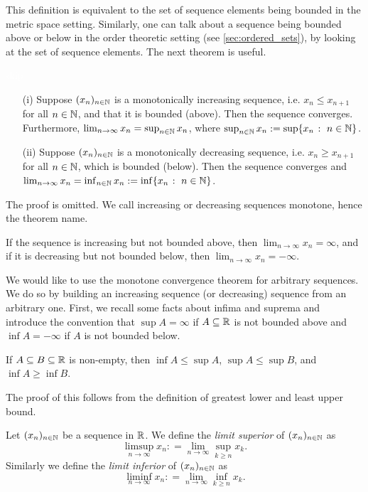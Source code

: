 \documentclass{article}
\begin{document}
This definition is equivalent to the set of sequence elements being bounded in the metric space setting. Similarly, one can talk about a sequence being bounded above or below in the order theoretic setting (see \cref{sec:ordered_sets}), by looking at the set of sequence elements. The next theorem is useful.

\begin{theorem}
\label{thm:mon_conv}
\textcolor{white}{skip}
\begin{itemize}
\item[(i)] Suppose $(x_n)_{n\in {\mathbb{N}}}$ is a monotonically increasing sequence, i.e. $x_n\leq x_{n+1}$ for all $n\in {\mathbb{N}}$, and that it is bounded (above). Then the sequence converges. Furthermore, $\lim_{n\to \infty} x_n = \sup_{n\in {\mathbb{N}}} x_n$, where $\sup_{n\in {\mathbb{N}}} x_n := \sup\{x_n \; \colon \; n\in {\mathbb{N}}\}$.
\item[(ii)] Suppose $(x_n)_{n\in {\mathbb{N}}}$ is a monotonically decreasing sequence, i.e. $x_n\geq x_{n+1}$ for all $n\in {\mathbb{N}}$, which is bounded (below). Then the sequence converges and $\lim_{n\to \infty} x_n = \inf_{n\in {\mathbb{N}}} x_n := \inf\{x_n \; \colon \; n\in {\mathbb{N}}\}$. 
\end{itemize}
\end{theorem}

The proof is omitted. We call increasing or decreasing sequences monotone, hence the theorem name.

If the sequence is increasing but not bounded above, then $\lim_{n\to \infty} x_n = \infty$, and if it is decreasing but not bounded below, then $\lim_{n\to \infty} x_n = -\infty$.

 We would like to use the monotone convergence theorem for arbitrary sequences. We do so by building an increasing sequence (or decreasing) sequence from an arbitrary one. First, we recall some facts about infima and suprema and introduce the convention that $\sup A = \infty$ if $A\subseteq {\mathbb{R}}$ is not bounded above and $\inf A= -\infty$ if $A$ is not bounded below.

\begin{lemma}\label{lem:inf_sup_inequality}
If $A \subseteq B \subseteq {\mathbb{R}}$ is non-empty, then $\inf A \leq \sup A$, $\sup A \leq \sup B$, and $\inf A \geq \inf B$.
\end{lemma}
The proof of this follows from the definition of greatest lower and least upper bound. 

\begin{definition}
Let $(x_n)_{n\in {\mathbb{N}}}$ be a sequence in ${\mathbb{R}}$. We define the \emph{limit superior} of $(x_n)_{n\in {\mathbb{N}}}$ as 
$$\limsup_{n\to \infty} x_n: = \lim_{n\to \infty} \sup_{k\geq n} x_k.$$ 
Similarly we define  the \emph{limit inferior} of $(x_n)_{n\in {\mathbb{N}}}$ as 
$$\liminf_{n\to \infty} x_n: = \lim_{n\to \infty} \inf_{k\geq n} x_k.$$
\end{definition}
\end{document}
